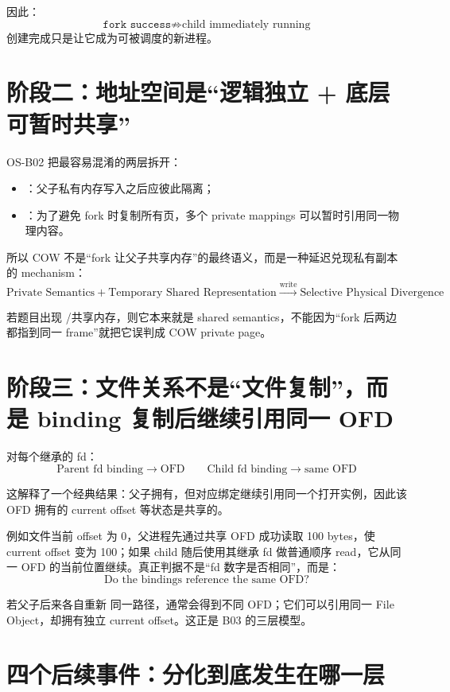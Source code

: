 \documentclass[UTF8,fontset=none,11pt,a4paper]{ctexart}
\begin{document}
因此：
\[
\boxed{\texttt{fork success} \not\Rightarrow \text{child immediately running}}
\]
创建完成只是让它成为可被调度的新进程。

\section{阶段二：地址空间是“逻辑独立 + 底层可暂时共享”}

OS-B02 把最容易混淆的两层拆开：
\begin{itemize}
  \item {}：父子私有内存写入之后应彼此隔离；
  \item {}：为了避免 fork 时复制所有页，多个 private mappings 可以暂时引用同一物理内容。
\end{itemize}

所以 COW 不是“fork 让父子共享内存”的最终语义，而是一种延迟兑现私有副本的 mechanism：
\[
\boxed{
\text{Private Semantics}
+
\text{Temporary Shared Representation}
\xrightarrow{\text{write}}
\text{Selective Physical Divergence}
}
\]

若题目出现 /共享内存，则它本来就是 shared semantics，不能因为“fork 后两边都指到同一 frame”就把它误判成 COW private page。

\section{阶段三：文件关系不是“文件复制”，而是 binding 复制后继续引用同一 OFD}

对每个继承的 fd：
\[
\boxed{
\text{Parent fd binding}\to\text{OFD}
\qquad
\text{Child fd binding}\to\text{same OFD}
}
\]

这解释了一个经典结果：父子拥有，但对应绑定继续引用同一个打开实例，因此该 OFD 拥有的 current offset 等状态是共享的。

例如文件当前 offset 为 0，父进程先通过共享 OFD 成功读取 100 bytes，使 current offset 变为 100；如果 child 随后使用其继承 fd 做普通顺序 read，它从同一 OFD 的当前位置继续。真正判据不是“fd 数字是否相同”，而是：
\[
\boxed{\text{Do the bindings reference the same OFD?}}
\]

若父子后来各自重新  同一路径，通常会得到不同 OFD；它们可以引用同一 File Object，却拥有独立 current offset。这正是 B03 的三层模型。

\section{四个后续事件：分化到底发生在哪一层}
\end{document}
